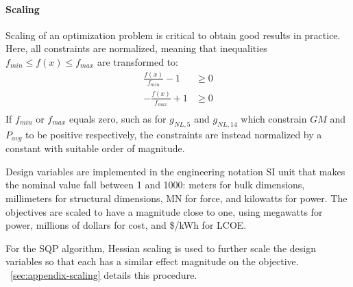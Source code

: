 \paragraph{Scaling}
Scaling of an optimization problem is critical to obtain good results in practice.
Here, all constraints are normalized, meaning that inequalities $f_{min} \leq f(x) \leq f_{max}$ are transformed to:
\begin{equation}
\begin{aligned}
    \frac{f(x)}{f_{min}}-1 &\geq 0 \\
    -\frac{f(x)}{f_{max}}+1 &\geq 0 \\
\end{aligned}
\end{equation}
If $f_{min}$ or $f_{max}$ equals zero, such as for $g_{NL,5}$ and $g_{NL,14}$ which constrain $GM$ and $P_{avg}$ to be positive respectively, the constraints are instead normalized by a constant with suitable order of magnitude.

Design variables are implemented in the engineering notation SI unit that makes the nominal value fall between 1 and 1000: meters for bulk dimensions, millimeters for structural dimensions, MN for force, and kilowatts for power.
The objectives are scaled to have a magnitude close to one, using megawatts for power, millions of dollars for cost, and \$/kWh for LCOE.

For the SQP algorithm, Hessian scaling is used to further scale the design variables so that each has a similar effect magnitude on the objective.
\appendixname~\ref{sec:appendix-scaling} details this procedure. 

